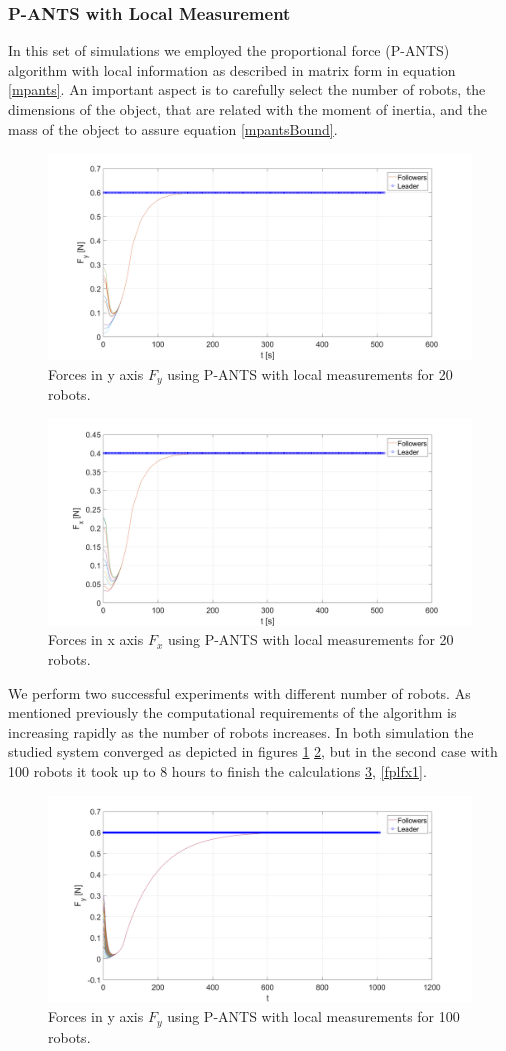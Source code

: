 \documentclass[letterpaper, 10 pt, conference]{ieeeconf}
\begin{document}
\subsubsection{P-ANTS with Local Measurement}
In this set of simulations we employed the proportional force (P-ANTS) algorithm with local information as described in matrix form in equation \ref{mpants}. An important aspect is to carefully select the number of robots, the dimensions of the object, that are related with the moment of inertia, and the mass of the object to assure equation \ref{mpantsBound}.
\begin{figure}[!b]
	\includegraphics[width=.53\textwidth]{figures/P_ANTS_Local_Fy.png}
	\centering
	\caption{Forces in y axis $F_y$ using P-ANTS with local measurements for 20 robots.}
	\label{fplfy}
\end{figure}
\begin{figure}[!h]
	\includegraphics[width=.53\textwidth]{figures/P_ANTS_Local_Fx.png}
	\centering
	\caption{Forces in x axis $F_x$ using P-ANTS with local measurements for 20 robots.}
	\label{fplfx}
\end{figure}
We perform two successful experiments with different number of robots. As mentioned previously the computational requirements of the algorithm is increasing rapidly as the number of robots increases. In both simulation the studied system converged as depicted in figures \ref{fplfy} \ref{fplfx}, but in the second case with 100 robots it took up to 8 hours to finish the calculations \ref{fplfy1}, \ref{fplfx1}.
\begin{figure}[!h]
	\includegraphics[width=.53\textwidth]{figures/P_ANTS_Local_Fy_100.png}
	\centering
	\caption{Forces in y axis $F_y$ using P-ANTS with local measurements for 100 robots.}
	\label{fplfy1}
\end{figure}
\end{document}
